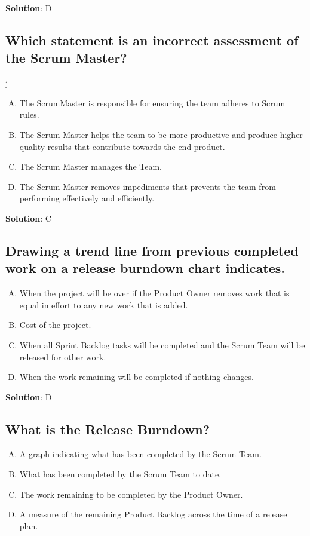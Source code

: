 \textbf{Solution}: D


\subsection{Which statement is an incorrect assessment of the Scrum Master?}j
\begin{enumerate}[A)]
  \item The ScrumMaster is responsible for ensuring the team adheres to Scrum rules.
  \item The Scrum Master helps the team to be more productive and produce higher quality results that contribute towards the end product.
  \item The Scrum Master manages the Team.
  \item The Scrum Master removes impediments that prevents the team from performing effectively and efficiently.
\end{enumerate}


\textbf{Solution}: C


\subsection{Drawing a trend line from previous completed work on a release burndown chart indicates.}
\begin{enumerate}[A)]
  \item When the project will be over if the Product Owner removes work that is equal in effort to any new work that is added.
  \item Cost of the project.
  \item When all Sprint Backlog tasks will be completed and the Scrum Team will be released for other work.
  \item When the work remaining will be completed if nothing changes.
\end{enumerate}


\textbf{Solution}: D


\subsection{What is the Release Burndown?}

\begin{enumerate}[A)]
  \item A graph indicating what has been completed by the Scrum Team.
  \item What has been completed by the Scrum Team to date.
  \item The work remaining to be completed by the Product Owner.
  \item A measure of the remaining Product Backlog across the time of a release plan.
\end{enumerate}


